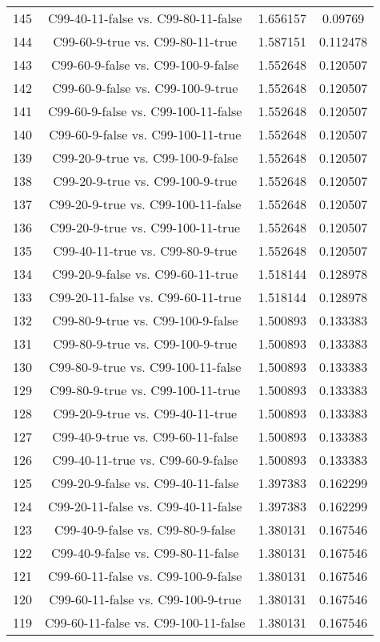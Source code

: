 \documentclass[a4paper,10pt]{article}
\begin{document}
\begin{landscape}
\begin{table}[!htp]
\begin{tabular}{cccc}
145&C99-40-11-false vs. C99-80-11-false&1.656157&0.09769\\
144&C99-60-9-true vs. C99-80-11-true&1.587151&0.112478\\
143&C99-60-9-false vs. C99-100-9-false&1.552648&0.120507\\
142&C99-60-9-false vs. C99-100-9-true&1.552648&0.120507\\
141&C99-60-9-false vs. C99-100-11-false&1.552648&0.120507\\
140&C99-60-9-false vs. C99-100-11-true&1.552648&0.120507\\
139&C99-20-9-true vs. C99-100-9-false&1.552648&0.120507\\
138&C99-20-9-true vs. C99-100-9-true&1.552648&0.120507\\
137&C99-20-9-true vs. C99-100-11-false&1.552648&0.120507\\
136&C99-20-9-true vs. C99-100-11-true&1.552648&0.120507\\
135&C99-40-11-true vs. C99-80-9-true&1.552648&0.120507\\
134&C99-20-9-false vs. C99-60-11-true&1.518144&0.128978\\
133&C99-20-11-false vs. C99-60-11-true&1.518144&0.128978\\
132&C99-80-9-true vs. C99-100-9-false&1.500893&0.133383\\
131&C99-80-9-true vs. C99-100-9-true&1.500893&0.133383\\
130&C99-80-9-true vs. C99-100-11-false&1.500893&0.133383\\
129&C99-80-9-true vs. C99-100-11-true&1.500893&0.133383\\
128&C99-20-9-true vs. C99-40-11-true&1.500893&0.133383\\
127&C99-40-9-true vs. C99-60-11-false&1.500893&0.133383\\
126&C99-40-11-true vs. C99-60-9-false&1.500893&0.133383\\
125&C99-20-9-false vs. C99-40-11-false&1.397383&0.162299\\
124&C99-20-11-false vs. C99-40-11-false&1.397383&0.162299\\
123&C99-40-9-false vs. C99-80-9-false&1.380131&0.167546\\
122&C99-40-9-false vs. C99-80-11-false&1.380131&0.167546\\
121&C99-60-11-false vs. C99-100-9-false&1.380131&0.167546\\
120&C99-60-11-false vs. C99-100-9-true&1.380131&0.167546\\
119&C99-60-11-false vs. C99-100-11-false&1.380131&0.167546\\

\end{tabular}
\end{table}
\end{landscape}
\end{document}
